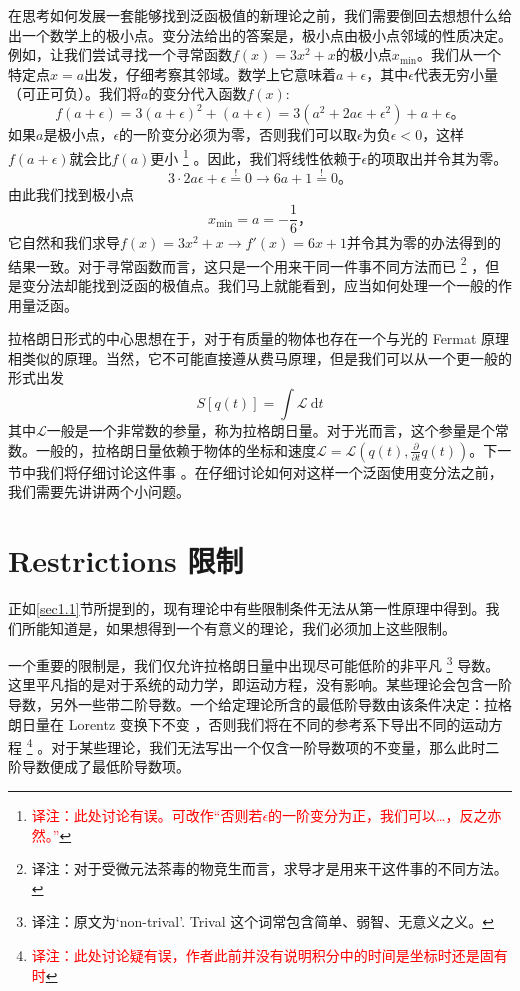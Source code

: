 在思考如何发展一套能够找到泛函极值的新理论之前，我们需要倒回去想想什么给出一个数学上的极小点。变分法给出的答案是，极小点由极小点邻域的性质决定。例如，让我们尝试寻找一个寻常函数\(f(x)=3x^2+x\)的极小点\(x_{\min}\)。我们从一个特定点\(x=a\)出发，仔细考察其邻域。数学上它意味着\(a + \epsilon\)，其中\(\epsilon\)代表无穷小量（可正可负）。我们将\(a\)的变分代入函数\(f(x)\):
\[
f(a+\epsilon) = 3(a+\epsilon)^2+(a+\epsilon) = 3(a^2+2a\epsilon+\epsilon^2)+a+\epsilon \text{。}
\]
如果\(a\)是极小点，\(\epsilon\)的一阶变分必须为零，否则我们可以取\(\epsilon\)为负\(\epsilon < 0\)，这样\(f(a+\epsilon)\)就会比\(f(a)\)更小%
\footnote{\textcolor{red}{译注：此处讨论有误。可改作“否则若$\epsilon$的一阶变分为正，我们可以\dots ，反之亦然。”}}%
。因此，我们将线性依赖于\(\epsilon\)的项取出并令其为零。
\[
3 \cdot 2a\epsilon + \epsilon \overset{\text{!}}{=} 0 \rightarrow 6a+1\overset{\text{!}}{=}0\text{。}
\]
由此我们找到极小点
\[
x_{\min} = a = -\frac{1}{6} \text{，}
\]
它自然和我们求导\(f(x)=3x^2+x\rightarrow f'(x)=6x+1\)并令其为零的办法得到的结果一致。对于寻常函数而言，这只是一个用来干同一件事不同方法而已%
\footnote{译注：对于受微元法茶毒的物竞生而言，求导才是用来干这件事的不同方法。}%
，但是变分法却能找到泛函的极值点。我们马上就能看到，应当如何处理一个一般的作用量泛函。

拉格朗日形式的中心思想在于，对于有质量的物体也存在一个与光的 Fermat 原理相类似的原理。当然，它不可能直接遵从费马原理，但是我们可以从一个更一般的形式出发
\[
S[q(t)]=\int {\mathcal L}~{\mathrm d}t
\]
其中\(\mathcal L\)一般是一个非常数的参量，称为拉格朗日量。对于光而言，这个参量是个常数。一般的，拉格朗日量依赖于物体的坐标和速度\({\mathcal L}={\mathcal L}(q(t),\frac{\partial}{\partial t} q(t))\)。下一节中我们将仔细讨论这件事%
%
。在仔细讨论如何对这样一个泛函使用变分法之前，我们需要先讲讲两个小问题。

\section[限制]{Restrictions \quad 限制}\label{sec4.2}
正如\ref{sec1.1}节所提到的，现有理论中有些限制条件无法从第一性原理中得到。我们所能知道是，如果想得到一个有意义的理论，我们必须加上这些限制。

一个重要的限制是，我们仅允许拉格朗日量中出现尽可能低阶的非平凡%
\footnote{译注：原文为`non-trival'. Trival 这个词常包含简单、弱智、无意义之义。}%
导数。这里平凡指的是对于系统的动力学，即运动方程，没有影响。某些理论会包含一阶导数，另外一些带二阶导数。一个给定理论所含的最低阶导数由该条件决定：拉格朗日量在 Lorentz 变换下不变%
%
，否则我们将在不同的参考系下导出不同的运动方程%
\footnote{\textcolor{red}{译注：此处讨论疑有误，作者此前并没有说明积分中的时间是坐标时还是固有时}}%
。对于某些理论，我们无法写出一个仅含一阶导数项的不变量，那么此时二阶导数便成了最低阶导数项。

